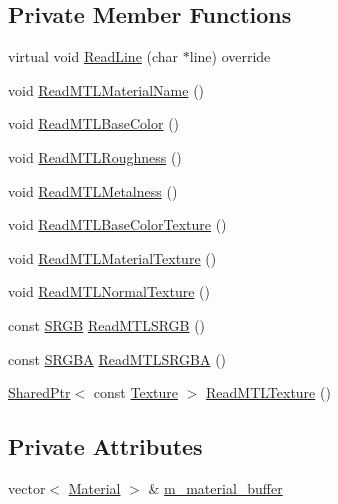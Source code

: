 \subsection*{Private Member Functions}
\begin{DoxyCompactItemize}
\item 
virtual void \hyperlink{classmage_1_1_m_t_l_reader_ac3981549364be195f96b32cfafc8b147}{Read\+Line} (char $\ast$line) override
\item 
void \hyperlink{classmage_1_1_m_t_l_reader_a53494ca5e0f905b97227b21711a1686a}{Read\+M\+T\+L\+Material\+Name} ()
\item 
void \hyperlink{classmage_1_1_m_t_l_reader_a047b7b3e156b46adffd1bc8770c3e8f0}{Read\+M\+T\+L\+Base\+Color} ()
\item 
void \hyperlink{classmage_1_1_m_t_l_reader_ad32f39a82a13727d30a76d9bbfacabf3}{Read\+M\+T\+L\+Roughness} ()
\item 
void \hyperlink{classmage_1_1_m_t_l_reader_a3c263193e37360194a33404fce986736}{Read\+M\+T\+L\+Metalness} ()
\item 
void \hyperlink{classmage_1_1_m_t_l_reader_ac91c1785c0a1d72f9c3bb1445e770a06}{Read\+M\+T\+L\+Base\+Color\+Texture} ()
\item 
void \hyperlink{classmage_1_1_m_t_l_reader_ade472b4a528a69ef05f10e83772a9a89}{Read\+M\+T\+L\+Material\+Texture} ()
\item 
void \hyperlink{classmage_1_1_m_t_l_reader_ae44a5704a09edb722f99a480a58c807a}{Read\+M\+T\+L\+Normal\+Texture} ()
\item 
const \hyperlink{structmage_1_1_s_r_g_b}{S\+R\+GB} \hyperlink{classmage_1_1_m_t_l_reader_ac8834c8e38397152d1be0a92874ca767}{Read\+M\+T\+L\+S\+R\+GB} ()
\item 
const \hyperlink{structmage_1_1_s_r_g_b_a}{S\+R\+G\+BA} \hyperlink{classmage_1_1_m_t_l_reader_a815e10592e7d24876b370b8b95d385e5}{Read\+M\+T\+L\+S\+R\+G\+BA} ()
\item 
\hyperlink{namespacemage_a1e01ae66713838a7a67d30e44c67703e}{Shared\+Ptr}$<$ const \hyperlink{classmage_1_1_texture}{Texture} $>$ \hyperlink{classmage_1_1_m_t_l_reader_a36dd3bbfd989698c9caeacc059d03e69}{Read\+M\+T\+L\+Texture} ()
\end{DoxyCompactItemize}
\subsection*{Private Attributes}
\begin{DoxyCompactItemize}
\item 
vector$<$ \hyperlink{classmage_1_1_material}{Material} $>$ \& \hyperlink{classmage_1_1_m_t_l_reader_a6382e0e9fce6581b129d18f5d82994c2}{m\+\_\+material\+\_\+buffer}
\end{DoxyCompactItemize}
